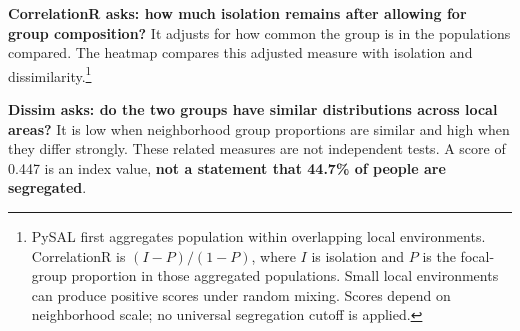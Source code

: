 \documentclass[10pt,a4paper]{article}
\begin{document}
\textbf{CorrelationR asks: how much isolation remains after allowing for group composition?} It adjusts for how common the group is in the populations compared. The heatmap compares this adjusted measure with isolation and dissimilarity.\footnote{PySAL first aggregates population within overlapping local environments. CorrelationR is $(I-P)/(1-P)$, where $I$ is isolation and $P$ is the focal-group proportion in those aggregated populations. Small local environments can produce positive scores under random mixing. Scores depend on neighborhood scale; no universal segregation cutoff is applied.}

\textbf{Dissim asks: do the two groups have similar distributions across local areas?} It is low when neighborhood group proportions are similar and high when they differ strongly. These related measures are not independent tests. A score of 0.447 is an index value, \textbf{not a statement that 44.7\% of people are segregated}.
\end{document}
